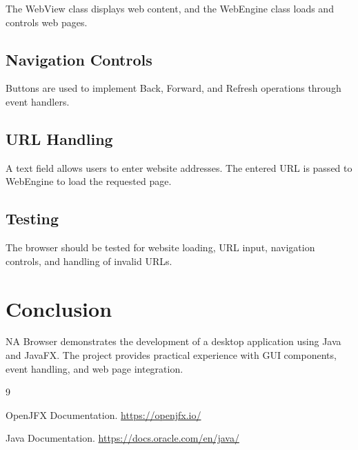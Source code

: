 \documentclass[12pt,a4paper]{report}
\begin{document}
The WebView class displays web content, and the
WebEngine class loads and controls web pages.

\section{Navigation Controls}

Buttons are used to implement Back, Forward, and
Refresh operations through event handlers.

\section{URL Handling}

A text field allows users to enter website addresses.
The entered URL is passed to WebEngine to load
the requested page.

\section{Testing}

The browser should be tested for website loading,
URL input, navigation controls, and handling of
invalid URLs.

\chapter{Conclusion}

NA Browser demonstrates the development of a desktop
application using Java and JavaFX. The project
provides practical experience with GUI components,
event handling, and web page integration.

\begin{thebibliography}{9}

OpenJFX Documentation.
\url{https://openjfx.io/}

Java Documentation.
\url{https://docs.oracle.com/en/java/}

\end{thebibliography}
\end{document}
